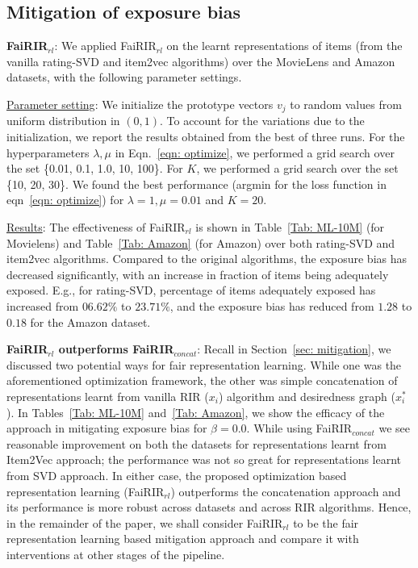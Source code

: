 \vspace{-2 mm}
\subsection{Mitigation of exposure bias} \label{sub:expt-mitigate-bias}


\noindent
\textbf{FaiRIR$_{rl}$}: We applied FaiRIR$_{rl}$ on the learnt representations of items (from the vanilla rating-SVD and item2vec algorithms) over the MovieLens and Amazon datasets, with the following parameter settings.

\noindent
\underline{Parameter setting}: We initialize the prototype vectors $v_j$ to random values from uniform distribution in $(0, 1)$. To account for the variations due to the initialization, we report the results obtained from the best of three runs. 
For the hyperparameters $\lambda, \mu$ in Eqn.~\ref{eqn: optimize}, we performed a grid search over the set \{0.01, 0.1, 1.0, 10, 100\}. For $K$, we performed a grid search over the set \{10, 20, 30\}. 
We found the best performance (argmin for the loss function in eqn~\ref{eqn: optimize}) for $\lambda = 1, \mu = 0.01$ and $K = 20$. 


\noindent
\underline{Results}: The effectiveness of FaiRIR$_{rl}$ is shown in Table~\ref{Tab: ML-10M} (for Movielens) and Table~\ref{Tab: Amazon} (for Amazon) over both rating-SVD and item2vec algorithms.  
Compared to the original algorithms, the exposure bias has decreased significantly, with an increase in fraction of items being adequately exposed. E.g., for rating-SVD, percentage of items adequately exposed has increased from $06.62\%$ to $23.71\%$, and the exposure bias has reduced from $1.28$ to $0.18$ for the Amazon dataset. 

\noindent
\textbf{FaiRIR$_{rl}$ outperforms FaiRIR$_{concat}$}: Recall in Section~\ref{sec: mitigation}, we discussed two potential ways for fair representation learning. While one was the aforementioned optimization framework, the other was simple concatenation of representations learnt from vanilla RIR ($x_i$) algorithm and desiredness graph ($x^*_i$). In Tables~\ref{Tab: ML-10M} and~\ref{Tab: Amazon}, we show the efficacy of the approach in mitigating exposure bias for $\beta = 0.0$. While using FaiRIR$_{concat}$ we see reasonable improvement on both the datasets for representations learnt from Item2Vec approach; the performance was not so great for representations learnt from SVD approach. In either case, the proposed optimization based representation learning (FaiRIR$_{rl}$) outperforms the concatenation approach and its performance is more robust across datasets and across RIR algorithms. Hence, in the remainder of the paper, we shall consider FaiRIR$_{rl}$ to be the fair representation learning based mitigation approach and compare it with interventions at other stages of the pipeline.



